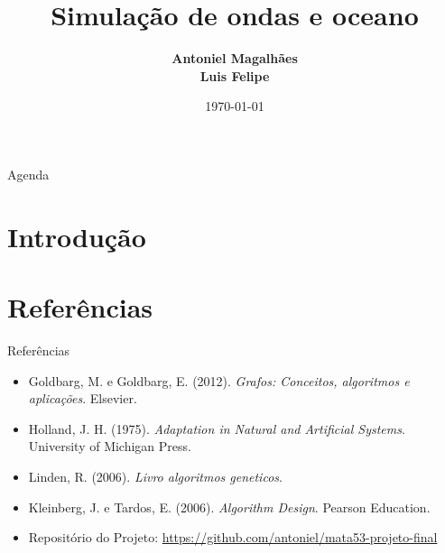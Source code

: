 \documentclass[aspectratio=169,xcolor=table]{beamer}
\author[Magalhães, Felipe]{%
  \textbf{Antoniel Magalhães} \\
  \textbf{Luis Felipe}
}
\title{Simulação de ondas e oceano}
\institute{Universidade Federal da Bahia \\ Instituto de Computação}
\date{\today}
\begin{document}
\begin{frame}
    \titlepage
\end{frame}

\begin{frame}{Agenda}
    \tableofcontents
\end{frame}

\section{Introdução}


\section{Referências}
\begin{frame}{Referências}
    \begin{itemize}
        \item Goldbarg, M. e Goldbarg, E. (2012). \emph{Grafos: Conceitos, algoritmos e aplicações}. Elsevier.
        \item Holland, J. H. (1975). \emph{Adaptation in Natural and Artificial Systems}. University of Michigan Press.
        \item Linden, R. (2006). \emph{Livro algoritmos geneticos}.
        \item Kleinberg, J. e Tardos, E. (2006). \emph{Algorithm Design}. Pearson Education.
        \item Repositório do Projeto: \url{https://github.com/antoniel/mata53-projeto-final}
    \end{itemize}
\end{frame}
\end{document}
